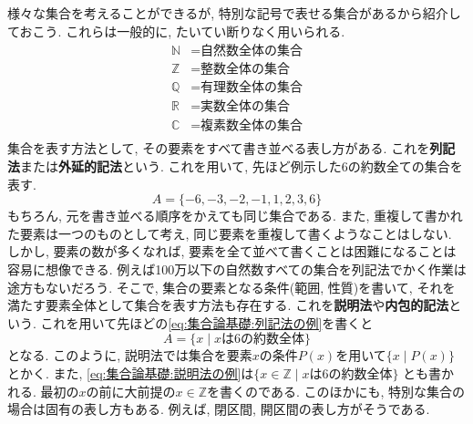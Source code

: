 \documentclass[a4j,dvipdfmx]{jsarticle}
\numberwithin{equation}{section}
\begin{document}
            様々な集合を考えることができるが, 特別な記号で表せる集合があるから紹介しておこう. これらは一般的に, たいてい断りなく用いられる.
            \begin{align*}
                \mathbb{N}&=\text{自然数全体の集合}\\
                \mathbb{Z}&=\text{整数全体の集合}\\
                \mathbb{Q}&=\text{有理数全体の集合}\\
                \mathbb{R}&=\text{実数全体の集合}\\
                \mathbb{C}&=\text{複素数全体の集合}\\
            \end{align*}
            集合を表す方法として, その要素をすべて書き並べる表し方がある. これを\textbf{列記法}または\textbf{外延的記法}という.
            これを用いて, 先ほど例示した6の約数全ての集合を表す.
            \begin{equation}
                A=\{-6,-3,-2,-1,1,2,3,6\} \label{eq:集合論基礎:列記法の例}
            \end{equation}
            もちろん, 元を書き並べる順序をかえても同じ集合である. また, 重複して書かれた要素は一つのものとして考え, 同じ要素を重複して書くようなことはしない.
            しかし, 要素の数が多くなれば, 要素を全て並べて書くことは困難になることは容易に想像できる. 例えば100万以下の自然数すべての集合を列記法でかく作業は途方もないだろう.
            そこで, 集合の要素となる条件(範囲, 性質)を書いて, それを満たす要素全体として集合を表す方法も存在する. これを\textbf{説明法}や\textbf{内包的記法}という.
            これを用いて先ほどの\eqref{eq:集合論基礎:列記法の例}を書くと
            \begin{equation}
                A=\{x\mid\text{$x$は6の約数全体}\} \label{eq:集合論基礎:説明法の例}
            \end{equation}
            となる. このように, 説明法では集合を要素$x$の条件$P(x)$を用いて$\{x\mid P(x)\}$とかく. また, \eqref{eq:集合論基礎:説明法の例}は$\{x\in\mathbb{Z}\mid\text{$x$は6の約数全体}\}$
            とも書かれる. 最初の$x$の前に大前提の$x\in\mathbb{Z}$を書くのである. このほかにも, 特別な集合の場合は固有の表し方もある. 例えば, 閉区間, 開区間の表し方がそうである.\\
\end{document}
